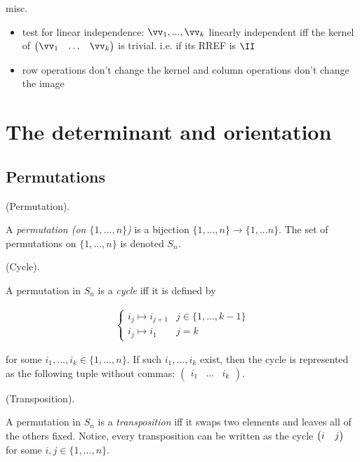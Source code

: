 misc.
\begin{itemize}
    \item test for linear independence: $\vv_1, ..., \vv_k$ linearly independent iff the kernel of $\begin{pmatrix} \vv_1 & \hdots & \vv_k \end{pmatrix}$ is trivial. i.e. if its RREF is $\II$
    \item row operations don't change the kernel and column operations don't change the image
\end{itemize}

\newpage

\section{The determinant and orientation}

\subsection*{Permutations}

\begin{defn}
    (Permutation).
    
    A \textit{permutation (on $\{1, ..., n\}$)} is a bijection $\{1, ..., n\} \rightarrow \{1, ... n \}$. The set of permutations on $\{1, ..., n\}$ is denoted $S_n$.
\end{defn}

\begin{defn}
    (Cycle).

    A permutation in $S_n$ is a \textit{cycle} iff it is defined by

    \begin{align*}
        \begin{cases}
            i_j \mapsto i_{j + 1} & j \in \{1, ..., k - 1\} \\
            i_j \mapsto i_1 & j = k
        \end{cases}
    \end{align*}

    for some $i_1, ..., i_k \in \{1, ..., n\}$. If such $i_1, ..., i_k$ exist, then the cycle is represented as the following tuple without commas: $\begin{pmatrix} i_1 & \hdots & i_k \end{pmatrix}$.
\end{defn}

\begin{defn}
    (Transposition).

    A permutation in $S_n$ is a \textit{transposition} iff it swaps two elements and leaves all of the others fixed. Notice, every transposition can be written as the cycle $\begin{pmatrix} i & j \end{pmatrix}$ for some $i, j \in \{1, ..., n\}$.
\end{defn}

